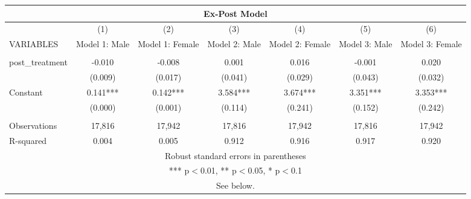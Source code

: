 \begin{tabular}{lcccccc}
\multicolumn{7}{c}{Ex-Post Model} \\ \hline
 & (1) & (2) & (3) & (4) & (5) & (6) \\
VARIABLES & Model 1: Male & Model 1: Female & Model 2: Male & Model 2: Female & Model 3: Male & Model 3: Female \\ \hline
 &  &  &  &  &  &  \\
post\_treatment & -0.010 & -0.008 & 0.001 & 0.016 & -0.001 & 0.020 \\
 & (0.009) & (0.017) & (0.041) & (0.029) & (0.043) & (0.032) \\
Constant & 0.141*** & 0.142*** & 3.584*** & 3.674*** & 3.351*** & 3.353*** \\
 & (0.000) & (0.001) & (0.114) & (0.241) & (0.152) & (0.242) \\
 &  &  &  &  &  &  \\
Observations & 17,816 & 17,942 & 17,816 & 17,942 & 17,816 & 17,942 \\
 R-squared & 0.004 & 0.005 & 0.912 & 0.916 & 0.917 & 0.920 \\ \hline
\multicolumn{7}{c}{ Robust standard errors in parentheses} \\
\multicolumn{7}{c}{ *** p$<$0.01, ** p$<$0.05, * p$<$0.1} \\
\multicolumn{7}{c}{ See below.} \\
\end{tabular}
